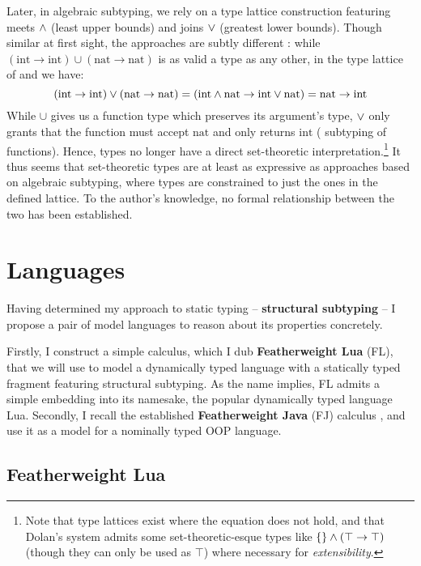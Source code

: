 Later, in algebraic subtyping, we rely on a type lattice construction featuring meets $\land$ (least upper bounds) and joins $\lor$ (greatest lower bounds). Though similar at first sight, the approaches are subtly different \cite{mlstruct}: while $(\mathrm{int} \to \mathrm{int}) \cup (\mathrm{nat} \to \mathrm{nat})$ is as valid a type as any other, in the type lattice of \mlsub{} \cite{mlsub} and \mlstruct{} \cite{mlstruct} we have: $$(\mathrm{int} \to \mathrm{int}) \lor (\mathrm{nat} \to \mathrm{nat}) = (\mathrm{int} \land \mathrm{nat} \to \mathrm{int} \lor \mathrm{nat}) = \mathrm{nat} \to \mathrm{int} $$
While $\cup$ gives us a function type which preserves its argument's type, $\lor$ only grants that the function must accept $\mathrm{nat}$ and only returns $\mathrm{int}$ (\cf{} subtyping of functions).
Hence, types no longer have a direct set-theoretic interpretation.\footnote{Note that type lattices exist where the equation does not hold, and that Dolan's system admits some set-theoretic-esque types like $\{\} \land (\top \to \top)$ (though they can only be used as $\top$) where necessary for \emph{extensibility}.} It thus seems that set-theoretic types are at least as expressive as approaches based on algebraic subtyping, where types are constrained to just the ones in the defined lattice. To the author's knowledge, no formal relationship between the two has been established.

\section{Languages}
\label{sec:languages}

Having determined my approach to static typing -- \textbf{structural subtyping} -- I propose a pair of model languages to reason about its properties concretely.

Firstly, I construct a simple calculus, which I dub \textbf{Featherweight Lua} (FL), that we will use to model a dynamically typed language with a statically typed fragment featuring structural subtyping. As the name implies, FL admits a simple embedding into its namesake, the popular dynamically typed language Lua. Secondly, I recall the established \textbf{Featherweight Java} (FJ) calculus \cite{featherweight-java}, and use it as a model for a nominally typed OOP language.  

\subsection{Featherweight Lua}
\label{subsec:featherweight-lua}

